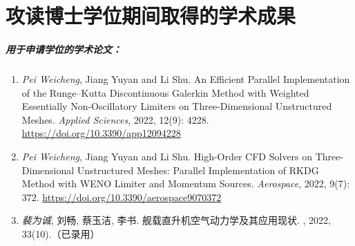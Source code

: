 \documentclass[doctor,openright,twoside,AutoFakeBold=true]{buaathesis}
\theoremstyle{plain}
\theoremstyle{definition}
\theoremstyle{plain}
\theoremstyle{plain}
\theoremstyle{remark}
\theoremstyle{remark}
\theoremstyle{definition}
\theoremstyle{plain}
\theoremstyle{definition}
\theoremstyle{plain}
\theoremstyle{plain}
\theoremstyle{remark}
\theoremstyle{plain}
\theoremstyle{definition}
\theoremstyle{remark}
\theoremstyle{plain}
\theoremstyle{remark}
\theoremstyle{definition}
\theoremstyle{plain}
\theoremstyle{plain}
\theoremstyle{definition}
\theoremstyle{plain}
\theoremstyle{plain}
\theoremstyle{definition}
\begin{document}
\begingroup

\renewcommand\citet[2][]{}
\renewcommand\cite[2][]{}
\renewcommand\upcite[2][]{}

\cleardoublepage
{}
{}
\listoffigures

\cleardoublepage
{}
{}
\listoftables

\endgroup
\printnomenclature

\mainmatter
\pagestyle{mainmatter}



\cleardoublepage
{}
{}

\cleardoublepage

\appendix


\backmatter

\chapter{攻读博士学位期间取得的学术成果}
\paragraph*{用于申请学位的学术论文：}
\begin{enumerate}
\item
\emph{Pei Weicheng}, Jiang Yuyan and Li Shu. An Efficient Parallel Implementation of the Runge–Kutta Discontinuous Galerkin Method with Weighted Essentially Non-Oscillatory Limiters on Three-Dimensional Unstructured Meshes. \textit{Applied Sciences}, 2022, 12(9): 4228.
\url{https://doi.org/10.3390/app12094228}

\item
\emph{Pei Weicheng}, Jiang Yuyan and Li Shu. High-Order CFD Solvers on Three-Dimensional Unstructured Meshes: Parallel Implementation of RKDG Method with WENO Limiter and Momentum Sources. \textit{Aerospace}, 2022, 9(7): 372.
\url{https://doi.org/10.3390/aerospace9070372}

\item
\emph{裴为诚}, 刘畅, 蔡玉洁, 李书. 舰载直升机空气动力学及其应用现状. , 2022, 33(10).（已录用）
\end{enumerate}
\end{document}
